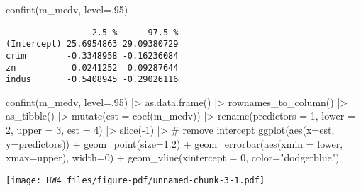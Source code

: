 \documentclass[
  letterpaper,
  DIV=11,
  numbers=noendperiod]{scrartcl}
\newenvironment{Shaded}{\begin{snugshade}}{\end{snugshade}}
\newcommand{\AttributeTok}[1]{\textcolor[rgb]{0.40,0.45,0.13}{#1}}
\newcommand{\CommentTok}[1]{\textcolor[rgb]{0.37,0.37,0.37}{#1}}
\newcommand{\DecValTok}[1]{\textcolor[rgb]{0.68,0.00,0.00}{#1}}
\newcommand{\FloatTok}[1]{\textcolor[rgb]{0.68,0.00,0.00}{#1}}
\newcommand{\FunctionTok}[1]{\textcolor[rgb]{0.28,0.35,0.67}{#1}}
\newcommand{\NormalTok}[1]{\textcolor[rgb]{0.00,0.23,0.31}{#1}}
\newcommand{\SpecialCharTok}[1]{\textcolor[rgb]{0.37,0.37,0.37}{#1}}
\newcommand{\StringTok}[1]{\textcolor[rgb]{0.13,0.47,0.30}{#1}}
\begin{document}
\begin{Shaded}
\begin{Highlighting}[]
\FunctionTok{confint}\NormalTok{(m\_medv, }\AttributeTok{level=}\NormalTok{.}\DecValTok{95}\NormalTok{) }
\end{Highlighting}
\end{Shaded}

\begin{verbatim}
                 2.5 %      97.5 %
(Intercept) 25.6954863 29.09380729
crim        -0.3348958 -0.16236084
zn           0.0241252  0.09287644
indus       -0.5408945 -0.29026116
\end{verbatim}

\begin{Shaded}
\begin{Highlighting}[]
\FunctionTok{confint}\NormalTok{(m\_medv, }\AttributeTok{level=}\NormalTok{.}\DecValTok{95}\NormalTok{) }\SpecialCharTok{|\textgreater{}} 
  \FunctionTok{as.data.frame}\NormalTok{() }\SpecialCharTok{|\textgreater{}} 
  \FunctionTok{rownames\_to\_column}\NormalTok{() }\SpecialCharTok{|\textgreater{}} 
  \FunctionTok{as\_tibble}\NormalTok{() }\SpecialCharTok{|\textgreater{}} 
  \FunctionTok{mutate}\NormalTok{(}\AttributeTok{est =} \FunctionTok{coef}\NormalTok{(m\_medv)) }\SpecialCharTok{|\textgreater{}} 
  \FunctionTok{rename}\NormalTok{(}\AttributeTok{predictors =} \DecValTok{1}\NormalTok{, }\AttributeTok{lower =} \DecValTok{2}\NormalTok{, }\AttributeTok{upper =} \DecValTok{3}\NormalTok{, }\AttributeTok{est =} \DecValTok{4}\NormalTok{)  }\SpecialCharTok{|\textgreater{}} 
  \FunctionTok{slice}\NormalTok{(}\SpecialCharTok{{-}}\DecValTok{1}\NormalTok{) }\SpecialCharTok{|\textgreater{}}  \CommentTok{\# remove intercept}
  \FunctionTok{ggplot}\NormalTok{(}\FunctionTok{aes}\NormalTok{(}\AttributeTok{x=}\NormalTok{est, }\AttributeTok{y=}\NormalTok{predictors)) }\SpecialCharTok{+}
  \FunctionTok{geom\_point}\NormalTok{(}\AttributeTok{size=}\FloatTok{1.2}\NormalTok{) }\SpecialCharTok{+}
  \FunctionTok{geom\_errorbar}\NormalTok{(}\FunctionTok{aes}\NormalTok{(}\AttributeTok{xmin =}\NormalTok{ lower, }\AttributeTok{xmax=}\NormalTok{upper), }\AttributeTok{width=}\DecValTok{0}\NormalTok{) }\SpecialCharTok{+}
  \FunctionTok{geom\_vline}\NormalTok{(}\AttributeTok{xintercept =} \DecValTok{0}\NormalTok{, }\AttributeTok{color=}\StringTok{"dodgerblue"}\NormalTok{) }
\end{Highlighting}
\end{Shaded}

\texttt{[image: HW4\_files/figure-pdf/unnamed-chunk-3-1.pdf]}
\end{document}
